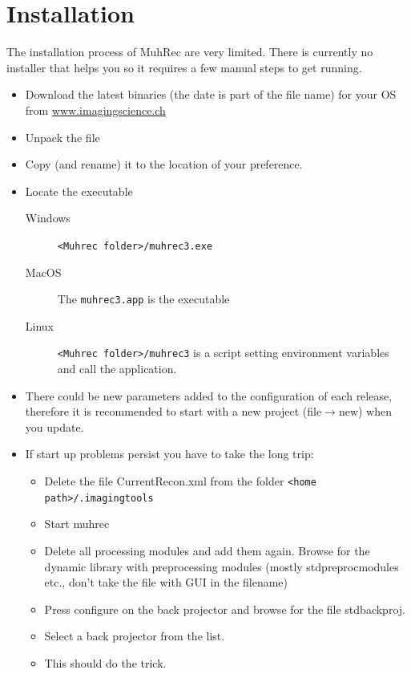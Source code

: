 \documentclass[a4paper]{scrreprt}
\begin{document}
\section{Installation}
The installation process of MuhRec are very limited. There is currently no installer that helps you so it requires a few manual steps to get running.
\begin{itemize}
\item Download the latest binaries (the date is part of the file name) for your OS from \href{http://www.imagingscience.ch/downloads.php}{www.imagingscience.ch}
\item Unpack the file
\item Copy (and rename) it to the location of your preference.
\item Locate the executable
\begin{description}
\item[Windows] \verb+<Muhrec folder>/muhrec3.exe+
\item[MacOS] The \verb+muhrec3.app+ is the executable
\item[Linux] \verb+<Muhrec folder>/muhrec3+ is a script setting environment variables and call the application. 
\end{description}
\item There could be new parameters added to the configuration of each release, therefore it is recommended to start with a new project (file$\rightarrow$new) when you update.
\item If start up problems persist you have to take the long trip:
\begin{itemize}
\item Delete the file CurrentRecon.xml from the folder \verb+<home path>/.imagingtools+
\item Start muhrec
\item Delete all processing modules and add them again. Browse for the dynamic library with preprocessing modules (mostly stdpreprocmodules etc., don't take the file with GUI in the filename)
\item Press configure on the back projector and browse for the file stdbackproj.
\item Select a back projector from the list.
\item This should do the trick.
\end{itemize}
\end{itemize}
\end{document}

